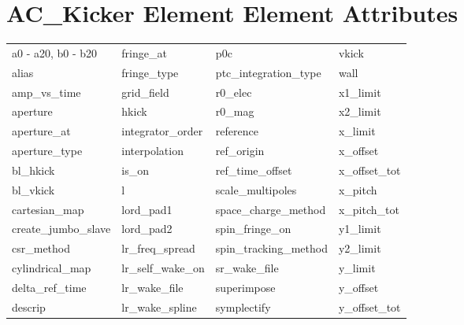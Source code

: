  \section{AC_Kicker Element Element Attributes}
 \label{s:list.ac.kicker}
 
 \begin{tabular}{llll} \toprule
a0 - a20, b0 - b20          & fringe_at                   & p0c                         & vkick                       \\
alias                       & fringe_type                 & ptc_integration_type        & wall                        \\
amp_vs_time                 & grid_field                  & r0_elec                     & x1_limit                    \\
aperture                    & hkick                       & r0_mag                      & x2_limit                    \\
aperture_at                 & integrator_order            & reference                   & x_limit                     \\
aperture_type               & interpolation               & ref_origin                  & x_offset                    \\
bl_hkick                    & is_on                       & ref_time_offset             & x_offset_tot                \\
bl_vkick                    & l                           & scale_multipoles            & x_pitch                     \\
cartesian_map               & lord_pad1                   & space_charge_method         & x_pitch_tot                 \\
create_jumbo_slave          & lord_pad2                   & spin_fringe_on              & y1_limit                    \\
csr_method                  & lr_freq_spread              & spin_tracking_method        & y2_limit                    \\
cylindrical_map             & lr_self_wake_on             & sr_wake_file                & y_limit                     \\
delta_ref_time              & lr_wake_file                & superimpose                 & y_offset                    \\
descrip                     & lr_wake_spline              & symplectify                 & y_offset_tot                \\

\end{tabular}
